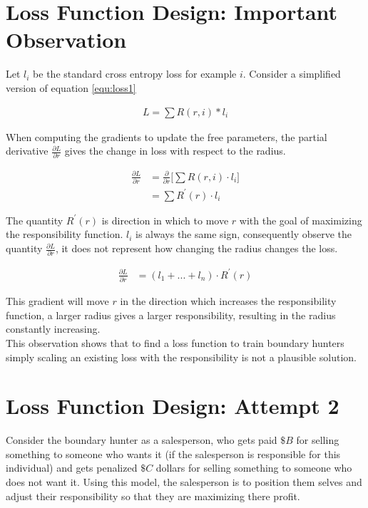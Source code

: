 \documentclass[notitlepage]{report}
\theoremstyle{definition}
\begin{document}
\section{Loss Function Design: Important Observation}
\label{sec:important-observation}
Let $l_i$ be the standard cross entropy loss for example $i$. Consider a simplified version of equation \ref{equ:loss1}

\begin{align*}
	L =\sum R(r, i) * l_i
\end{align*}

When computing the gradients to update the free parameters, the partial derivative $\frac{\partial L}{\partial r}$ gives the change in loss with respect to the radius.

\begin{align*}
\frac{\partial L}{\partial r} &= \frac{\partial}{\partial r} \big[ \sum R(r, i)  \cdot l_i \big] \\
&= \sum R^{'} (r) \cdot l_i
\end{align*} 

The quantity $R^{'} (r)$ is direction in which to move $r$ with the goal of maximizing the responsibility function. $l_i$ is always the same sign, consequently observe the quantity $\frac{\partial L}{\partial r}$, it does not represent how changing the radius changes the loss.

\begin{align*}
	\frac{\partial L}{\partial r} &= (l_1 + ... + l_n) \cdot R^{'} (r)
\end{align*}

This gradient will move $r$ in the direction which increases the responsibility function, a larger radius gives a larger responsibility, resulting in the radius constantly increasing.\\

This observation shows that to find a loss function to train boundary hunters simply scaling an existing loss with the responsibility is not a plausible solution.

\section{Loss Function Design: Attempt 2}
Consider the boundary hunter as a salesperson, who gets paid $\$B$ for selling something to someone who wants it (if the salesperson is responsible for this individual) and gets penalized $\$C$ dollars for selling something to someone who does not want it. Using this model, the salesperson is to position them selves and adjust their responsibility so that they are maximizing there profit.\\
\end{document}
